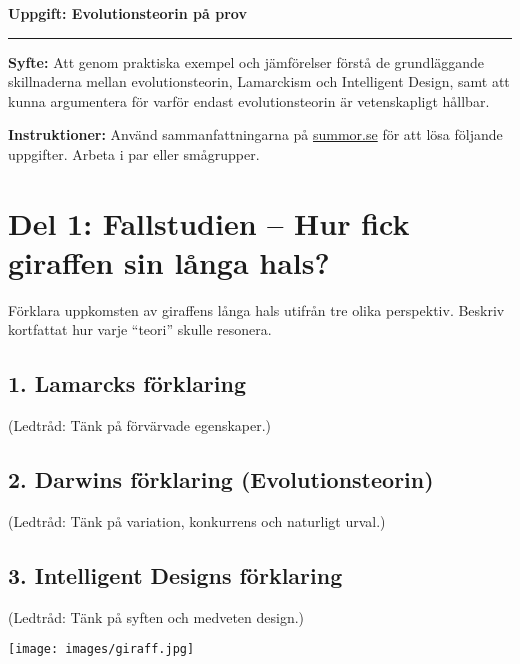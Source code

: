 \documentclass[12pt,a4paper]{article}
\begin{document}
\begin{center}
    {\huge \bfseries Uppgift: Evolutionsteorin på prov}
    \vspace{0.5em}
    \hrule
\end{center}

\vspace{1em}

\textbf{Syfte:} Att genom praktiska exempel och jämförelser förstå de grundläggande skillnaderna mellan evolutionsteorin, Lamarckism och Intelligent Design, samt att kunna argumentera för varför endast evolutionsteorin är vetenskapligt hållbar.

\textbf{Instruktioner:} Använd sammanfattningarna på \href{https://summor.se/nak2/5}{summor.se} för att lösa följande uppgifter. Arbeta i par eller smågrupper.

\newpage

\section*{Del 1: Fallstudien – Hur fick giraffen sin långa hals?}

Förklara uppkomsten av giraffens långa hals utifrån tre olika perspektiv. Beskriv kortfattat hur varje ``teori'' skulle resonera.

\subsection*{1. Lamarcks förklaring}
(Ledtråd: Tänk på förvärvade egenskaper.)

\vspace{5em}

\subsection*{2. Darwins förklaring (Evolutionsteorin)}
(Ledtråd: Tänk på variation, konkurrens och naturligt urval.)

\vspace{5em}

\subsection*{3. Intelligent Designs förklaring}
(Ledtråd: Tänk på syften och medveten design.)

\vspace{5em}

\begin{center}
    \texttt{[image: images/giraff.jpg]}
\end{center}
\end{document}

